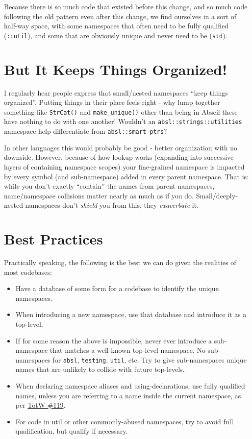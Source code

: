 Because there is so much code that existed before this change, and so much code following the old pattern even after this change, we find ourselves in a sort of half-way space, with some namespaces that often need to be fully qualified (\texttt{::util}), and some that are obviously unique and never need to be (\texttt{std}).

\section{But It Keeps Things Organized!}
I regularly hear people express that small/nested namespaces \enquote{keep things organized}. Putting things in their place feels right - why lump together something like \texttt{StrCat()} and \texttt{make_unique()} other than being in Abseil these have nothing to do with one another! Wouldn’t an \texttt{absl::strings::utilities} namespace help differentiate from \texttt{absl::smart_ptrs}?

In other languages this would probably be good - better organization with no downside. However, because of how lookup works (expanding into successive layers of containing namespace scopes) your fine-grained namespace is impacted by every symbol (and sub-namespace) added in every parent namespace. That is: while you don’t exactly \enquote{contain} the names from parent namespaces, name/namespace collisions matter nearly as much as if you do. Small/deeply-nested namespaces don’t \emph{shield} you from this, they \emph{exacerbate} it.

\section{Best Practices}
Practically speaking, the following is the best we can do given the realities of most codebases:
\begin{itemize}
  \item Have a database of some form for a codebase to identify the unique namespaces.
  \item When introducing a new namespace, use that database and introduce it as a top-level.
  \item If for some reason the above is impossible, never ever introduce a sub-namespace that matches a well-known top-level namespace. No sub-namespaces for \texttt{absl}, \texttt{testing}, \texttt{util}, etc. Try to give sub-namespaces unique names that are unlikely to collide with future top-levels.
  \item When declaring namespace aliases and using-declarations, use fully qualified names, unless you are referring to a name inside the current namespace, as per \hyperref[ch:tip-of-the-week-119]{TotW \#119}.
  \item For code in util or other commonly-abused namespaces, try to avoid full qualification, but qualify if necessary.
\end{itemize}


